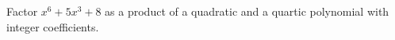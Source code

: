 Factor $x^{6}+5x^{3}+8$ as a product of a quadratic and a quartic polynomial with integer coefficients.
